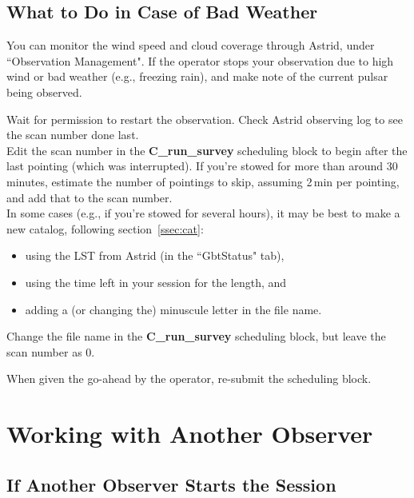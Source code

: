 \documentclass[11pt]{article}
\begin{document}
\subsection{What to Do in Case of Bad Weather}\label{ssec:weath}  %
You can monitor the wind speed and cloud coverage through Astrid, under ``Observation Management".  If the operator stops your observation due to high wind or bad weather (e.g., freezing rain), and make note of the current pulsar being observed. 

\noindent Wait for permission to restart the observation.  Check Astrid observing log to see the scan number done last. \\
Edit the scan number in the \textbf{C\_run\_survey} scheduling block to begin after the last pointing (which was interrupted).  If you're stowed for more than around 30 minutes, estimate the number of pointings to skip, assuming 2\,min per pointing, and add that to the scan number. \\
In some cases (e.g., if you're stowed for several hours), it may be best to make a new catalog, following section~\ref{ssec:cat}: \begin{itemize}
\item using the LST from Astrid (in the ``GbtStatus" tab), 
\item using the time left in your session for the length, and
\item adding a (or changing the) minuscule letter in the file name.  \end{itemize}
Change the file name in the \textbf{C\_run\_survey} scheduling block, but leave the scan number as 0.

When given the go-ahead by the operator, re-submit the scheduling block. 



\section{Working with Another Observer}\label{sec:share} %

\subsection{If Another Observer Starts the Session} %
\end{document}
